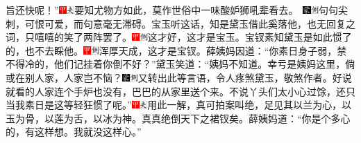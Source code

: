 旨还快呢！”{{\includegraphics[width=3mm]{../Images/00002}\includegraphics[width=3mm]{../Images/00012}\footnotesize \kaishu 要知尤物方如此，莫作世俗中一味酸妒狮吼辈看去。　}\includegraphics[width=3mm]{../Images/00006}\includegraphics[width=3mm]{../Images/00011}\footnotesize \kaishu 句句尖刺，可恨可爱，而句意毫无滞碍。}宝玉听这话，知是黛玉借此奚落他，也无回复之词，只嘻嘻的笑了两阵罢了。{\includegraphics[width=3mm]{../Images/00002}\includegraphics[width=3mm]{../Images/00011}\footnotesize \kaishu 这才好，这才是宝玉。}宝钗素知黛玉是如此惯了的，也不去睬他。{\includegraphics[width=3mm]{../Images/00002}\includegraphics[width=3mm]{../Images/00011}\footnotesize \kaishu 浑厚天成，这才是宝钗。}薛姨妈因道：“你素日身子弱，禁不得冷的，他们记挂着你倒不好？”黛玉笑道：“姨妈不知道。幸亏是姨妈这里，倘或在别人家，人家岂不恼？{\includegraphics[width=3mm]{../Images/00006}\includegraphics[width=3mm]{../Images/00011}\footnotesize \kaishu 又转出此等言语，令人疼煞黛玉，敬煞作者。}好说就看的人家连个手炉也没有，巴巴的从家里送个来。不说丫头们太小心过馀，还只当我素日是这等轻狂惯了呢。”{\includegraphics[width=3mm]{../Images/00002}\includegraphics[width=3mm]{../Images/00012}\footnotesize \kaishu 用此一解，真可拍案叫绝，足见其以兰为心，以玉为骨，以莲为舌，以冰为神。真真绝倒天下之裙钗矣。}薛姨妈道：“你是个多心的，有这样想。我就没这样心。”

